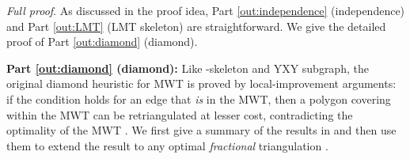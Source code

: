 \documentclass[final]{siamltex}
\newenvironment{fullproof}{\par{\it Full proof}. \ignorespaces}{\endproof}
\begin{document}
\begin{fullproof}
As discussed in the proof idea, Part \ref{out:independence} (independence) 
and Part \ref{out:LMT} (LMT skeleton) are straightforward. We give the detailed proof of 
Part \ref{out:diamond} (diamond).



\bigskip
\noindent
{\bf Part \ref{out:diamond} (diamond):}
Like -skeleton and YXY subgraph, 
the original diamond heuristic for MWT is proved by local-improvement arguments:
if the condition holds for an edge  that {\em is} in the MWT,
then a polygon covering  within the MWT can be retriangulated at lesser cost,
contradicting the optimality of the MWT \cite{das1989triangulations,drysdale2001exclusion}.
We first give a summary of the results in \cite{drysdale2001exclusion} 
and then use them to extend the result to any optimal {\em fractional} triangulation .


\end{fullproof}
\end{document}
